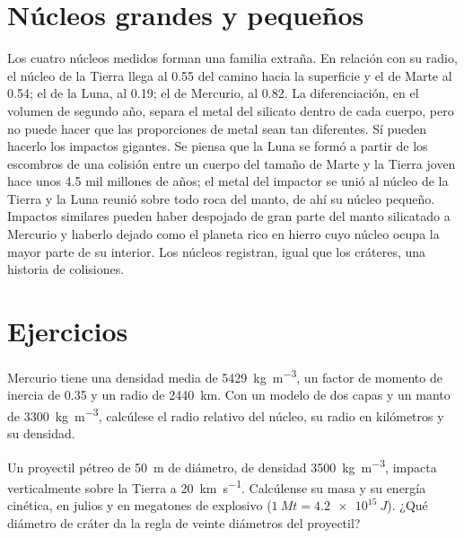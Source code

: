 \section{Núcleos grandes y pequeños}\label{sec:b3:planetary-interiors-surfaces:cores}

Los cuatro núcleos medidos forman una familia extraña. En relación con su radio, el
núcleo de la Tierra llega al 0.55 del camino hacia la superficie y el de Marte al 0.54; el
de la Luna, al 0.19; el de Mercurio, al 0.82. La diferenciación, en el volumen de segundo año, separa
el metal del silicato dentro de cada cuerpo, pero no puede hacer que las proporciones de
metal sean tan diferentes. Sí pueden hacerlo los impactos gigantes. Se piensa que la Luna se formó
a partir de los escombros de una colisión entre un cuerpo del tamaño de Marte y la
Tierra joven hace unos 4.5 mil millones de años; el metal del impactor se unió
al núcleo de la Tierra y la Luna reunió sobre todo roca del manto, de ahí su
núcleo pequeño. Impactos similares pueden haber despojado de gran parte del manto
silicatado a Mercurio y haberlo dejado como el planeta rico en hierro cuyo núcleo ocupa la mayor parte
de su interior. Los núcleos registran, igual que los cráteres, una historia de colisiones.

\section{Ejercicios}

\begin{exercise}[$\star$]\label{exo:b3:planetary-interiors-surfaces:1}
Mercurio tiene una densidad media de \qty{5429}{kg.m^{-3}}, un factor de momento de
inercia de 0.35 y un radio de \qty{2440}{km}. Con un modelo de dos capas y un
manto de \qty{3300}{kg.m^{-3}}, calcúlese el radio relativo del núcleo, su radio en
kilómetros y su densidad.
\end{exercise}

\begin{exercise}[$\star$]\label{exo:b3:planetary-interiors-surfaces:2}
Un proyectil pétreo de \qty{50}{m} de diámetro, de densidad \qty{3500}{kg.m^{-3}},
impacta verticalmente sobre la Tierra a \qty{20}{km.s^{-1}}. Calcúlense su masa y
su energía cinética, en julios y en megatones de explosivo
($\qty{1}{Mt} = \qty{4.2e15}{J}$). ¿Qué diámetro de cráter da la regla
de veinte diámetros del proyectil?
\end{exercise}

